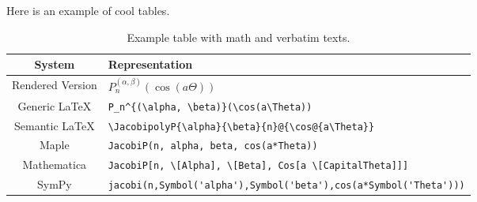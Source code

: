 Here is an example of cool tables.

\begin{table}[ht]
\caption{Example table with math and verbatim texts.}
\label{tab:jacobi}
\centering
\renewcommand{\arraystretch}{1.5}
\begin{tabular}{c:l}\hline
\textbf{System} & \hspace{0.1cm}\textbf{Representation} \\\hline
{}Rendered Version & \hspace{0.1cm}$P_n^{(\alpha, \beta)}(\cos(a\Theta))$ \\
Generic \LaTeX & \hspace{0.1cm}\small\verb|P_n^{(\alpha, \beta)}(\cos(a\Theta))| \\
Semantic \LaTeX & \hspace{0.1cm}\small \verb|\JacobipolyP{\alpha}{\beta}{n}@{\cos@{a\Theta}}| \\
Maple & \hspace{0.1cm}\small\verb|JacobiP(n, alpha, beta, cos(a*Theta))| \\
Mathematica & \hspace{0.1cm}\small \verb|JacobiP[n, \[Alpha], \[Beta], Cos[a \[CapitalTheta]]]| \\
SymPy & \hspace{0.1cm}\footnotesize\verb|jacobi(n,Symbol('alpha'),Symbol('beta'),cos(a*Symbol('Theta')))| \\\hline
\end{tabular}
\end{table}

